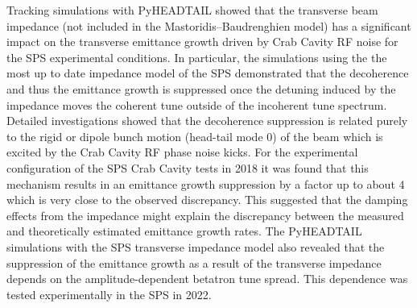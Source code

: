 Tracking simulations with PyHEADTAIL showed that the transverse beam impedance (not included in the Mastoridis--Baudrenghien model) has a significant impact on the transverse emittance growth driven by Crab Cavity RF noise for the SPS experimental conditions. In particular, the simulations using the the most up to date impedance model of the SPS demonstrated that the decoherence and thus the emittance growth is suppressed once the detuning induced by the impedance moves the coherent tune outside of the incoherent tune spectrum. %
Detailed investigations showed that the decoherence suppression is related purely to the rigid or dipole bunch motion (head-tail mode 0) of the beam which is excited by the Crab Cavity RF phase noise kicks. For the experimental configuration of the SPS Crab Cavity tests in 2018 it was found that this mechanism results in an emittance growth suppression by a factor up to about 4 which is very close to the observed discrepancy. This suggested that the damping effects from the impedance might explain the discrepancy between the measured and theoretically estimated emittance growth rates. The PyHEADTAIL simulations with the SPS transverse impedance model also revealed that the suppression of the emittance growth as a result of the transverse impedance depends on the amplitude-dependent betatron tune spread. This dependence was tested experimentally in the SPS in 2022.


